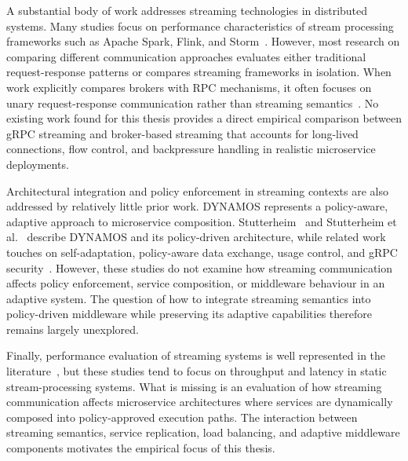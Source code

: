 A substantial body of work addresses streaming technologies in distributed systems. Many studies focus on performance characteristics of stream processing frameworks such as Apache Spark, Flink, and Storm~\cite{karimov2018benchmarking,fragkoulis2024survey,lote2022realtime}. However, most research on comparing different communication approaches evaluates either traditional request-response patterns or compares streaming frameworks in isolation. When work explicitly compares brokers with RPC mechanisms, it often focuses on unary request-response communication rather than streaming semantics~\cite{ibrahim2026brokers,nuikka2021cloudnative,johansson2020rpc5g,coviello2022dataxc}. No existing work found for this thesis provides a direct empirical comparison between gRPC streaming and broker-based streaming that accounts for long-lived connections, flow control, and backpressure handling in realistic microservice deployments.

Architectural integration and policy enforcement in streaming contexts are also addressed by relatively little prior work. DYNAMOS represents a policy-aware, adaptive approach to microservice composition. Stutterheim~\cite{stutterheim2023thesis} and Stutterheim et al.~\cite{stutterheim2023icsa} describe DYNAMOS and its policy-driven architecture, while related work touches on self-adaptation, policy-aware data exchange, usage control, and gRPC security~\cite{figueira2024selfadaptive,neumaier2021policyaware,park2004ucon,thiyagarajan2025grpcsecurity}. However, these studies do not examine how streaming communication affects policy enforcement, service composition, or middleware behaviour in an adaptive system. The question of how to integrate streaming semantics into policy-driven middleware while preserving its adaptive capabilities therefore remains largely unexplored.

Finally, performance evaluation of streaming systems is well represented in the literature~\cite{karimov2018benchmarking,vogel2024faultRecovery,systematicstreaming,sodankoor2026grpcbench,lote2022realtime}, but these studies tend to focus on throughput and latency in static stream-processing systems. What is missing is an evaluation of how streaming communication affects microservice architectures where services are dynamically composed into policy-approved execution paths. The interaction between streaming semantics, service replication, load balancing, and adaptive middleware components motivates the empirical focus of this thesis.
